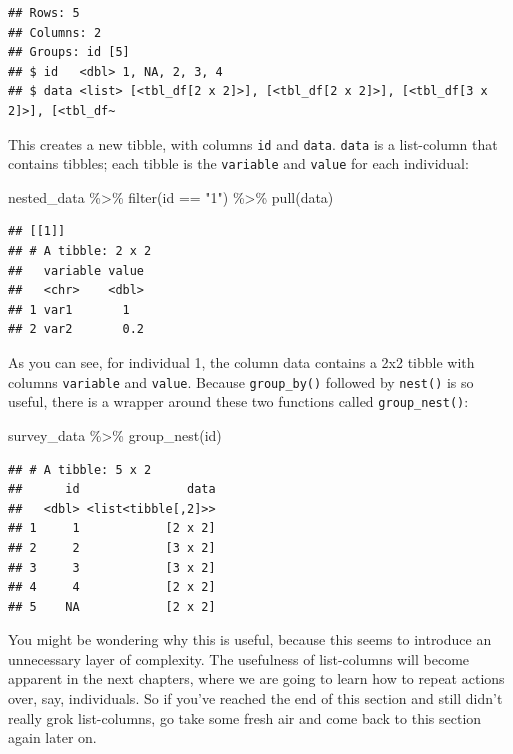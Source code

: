 \documentclass[
]{article}
\newenvironment{Shaded}{\begin{snugshade}}{\end{snugshade}}
\newcommand{\FunctionTok}[1]{\textcolor[rgb]{0.00,0.00,0.00}{#1}}
\newcommand{\NormalTok}[1]{#1}
\newcommand{\SpecialCharTok}[1]{\textcolor[rgb]{0.00,0.00,0.00}{#1}}
\newcommand{\StringTok}[1]{\textcolor[rgb]{0.31,0.60,0.02}{#1}}
\begin{document}
\begin{verbatim}
## Rows: 5
## Columns: 2
## Groups: id [5]
## $ id   <dbl> 1, NA, 2, 3, 4
## $ data <list> [<tbl_df[2 x 2]>], [<tbl_df[2 x 2]>], [<tbl_df[3 x 2]>], [<tbl_df~
\end{verbatim}

This creates a new tibble, with columns \texttt{id} and \texttt{data}. \texttt{data} is a list-column that contains
tibbles; each tibble is the \texttt{variable} and \texttt{value} for each individual:

\begin{Shaded}
\begin{Highlighting}[]
\NormalTok{nested\_data }\SpecialCharTok{\%\textgreater{}\%}
  \FunctionTok{filter}\NormalTok{(id }\SpecialCharTok{==} \StringTok{"1"}\NormalTok{) }\SpecialCharTok{\%\textgreater{}\%}
  \FunctionTok{pull}\NormalTok{(data)}
\end{Highlighting}
\end{Shaded}

\begin{verbatim}
## [[1]]
## # A tibble: 2 x 2
##   variable value
##   <chr>    <dbl>
## 1 var1       1  
## 2 var2       0.2
\end{verbatim}

As you can see, for individual 1, the column data contains a 2x2 tibble with columns \texttt{variable} and
\texttt{value}. Because \texttt{group\_by()} followed by \texttt{nest()} is so useful, there is a wrapper around these two functions
called \texttt{group\_nest()}:

\begin{Shaded}
\begin{Highlighting}[]
\NormalTok{survey\_data }\SpecialCharTok{\%\textgreater{}\%}
  \FunctionTok{group\_nest}\NormalTok{(id)}
\end{Highlighting}
\end{Shaded}

\begin{verbatim}
## # A tibble: 5 x 2
##      id               data
##   <dbl> <list<tibble[,2]>>
## 1     1            [2 x 2]
## 2     2            [3 x 2]
## 3     3            [3 x 2]
## 4     4            [2 x 2]
## 5    NA            [2 x 2]
\end{verbatim}

You might be wondering why this is useful, because this seems to introduce an unnecessary
layer of complexity. The usefulness of list-columns will become apparent in the next chapters,
where we are going to learn how to repeat actions over, say, individuals. So if you've reached
the end of this section and still didn't really grok list-columns, go take some fresh air and
come back to this section again later on.
\end{document}
